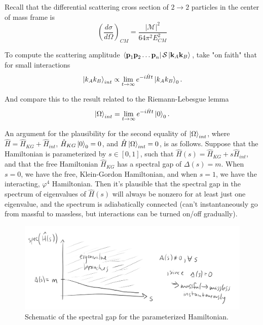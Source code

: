 \noindent Recall that the differential scattering cross section of $2\to 2$ particles in the center of mass frame is
\begin{equation}
\left( \frac{d\sigma}{d\Omega}\right)_{CM} = \frac{|\mathcal{M}|^2}{64 \pi^2 E^2_{CM}}
\end{equation}

\noindent To compute the scattering amplitude $\bra{\textbf{p}_1 \textbf{p}_2 \dots \textbf{p}_n} \mathcal{S} \ket{\textbf{k}_A \textbf{k}_B}$, take "on faith" that for small interactions
\begin{equation}
\ket{k_A k_B}_{int} \propto \lim_{t\to\infty} e^{-i\hat{H}t} \ket{k_A k_B}_0 .
\end{equation}

\noindent And compare this to the result related to the Riemann-Lebesgue lemma
\begin{equation}
\ket{\Omega}_{int} = \lim_{t\to\infty} e^{-i\hat{H}t} \ket{0}_0 . 
\end{equation}

\noindent An argument for the plausibility for the second equality of $\ket{\Omega}_{int}$, where $\hat{H} = \hat{H}_{KG} + \hat{H}_{int}$, $\hat{H}_{KG}\ket{0}_0 = 0$, and $\hat{H}\ket{\Omega}_{int} = 0$, is as follows. Suppose that the Hamiltonian is parameterized by $s \in [0,1]$, such that $\hat{H}(s) = \hat{H}_{KG} + s \hat{H}_{int}$, and that the free Hamiltonian $\hat{H}_{KG}$ has a spectral gap of $\Delta(s)=m$. When $s=0$, we have the free, Klein-Gordon Hamiltonian, and when $s=1$, we have the interacting, $\varphi^4$ Hamiltonian. Then it's plausible that the spectral gap in the spectrum of eigenvalues of $\hat{H}(s)$ will always be nonzero for at least just one eigenvalue, and the spectrum is adiabatically connected (can't instantaneously go from massful to massless, but interactions can be turned on/off gradually). \\

\begin{figure}[H]
	\centering
	\includegraphics[scale=0.4]{images/eivs.png}
	\caption{Schematic of the spectral gap for the parameterized Hamiltonian.}
\end{figure}

